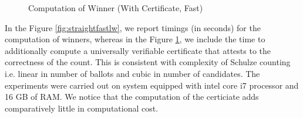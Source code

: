    
 \begin{figure}[!htb]
        \caption{\label{fig:straightfastlv} Computation of Winner (With Certificate, Fast)}
\end{figure}   




\noindent
In the Figure \ref{fig:straightfastlw}, we report timings (in seconds) for the computation of
winners, whereas in the Figure \ref{fig:straightfastlv}, we include the time to additionally
compute a universally verifiable certificate that attests  to the
correctness of the count. This is consistent with complexity of Schulze 
counting i.e. linear in number of ballots and cubic in number of candidates. 
The experiments were carried out on system 
equipped with intel core i7 processor and 16 GB of RAM. We notice that the
computation of the certiciate adds comparatively little in
computational cost. 

